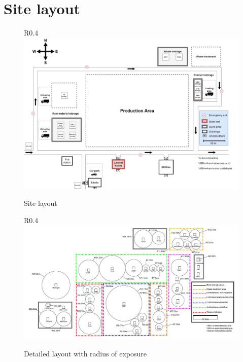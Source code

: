 \section{Site layout}


\begin{figure}{R}{0.4\linewidth}
\centering
\includegraphics[width=\linewidth]{chapters/Z-support/figures/Sitelayout.jpg}
\caption{Site layout}
\label{fig:site}
\end{figure}

\begin{figure}{R}{0.4\linewidth}
\centering
\includegraphics[width=\linewidth]{chapters/Z-support/figures/detailedlayout.jpg}
\caption{Detailed layout with radius of exposure}
\label{fig:detailed_layout}
\end{figure}